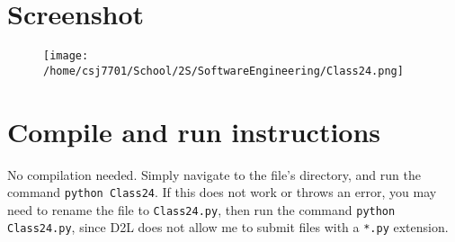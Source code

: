 \documentclass[11pt]{article}
\author{Christian Johnson}
\date{\today}
\title{}
\begin{document}
\section{Screenshot}
\label{sec:orgcbcc9cd}
\begin{figure}[htbp]
\centering
\texttt{[image: /home/csj7701/School/2S/SoftwareEngineering/Class24.png]}
\bicaption{---}
\end{figure}

\section{Compile and run instructions}
\label{sec:org02b2bf6}

No compilation needed.
Simply navigate to the file's directory, and run the command \texttt{python Class24}.
If this does not work or throws an error, you may need to rename the file to \texttt{Class24.py}, then run the command \texttt{python Class24.py}, since D2L does not allow me to submit files with a \texttt{*.py} extension.
\end{document}
